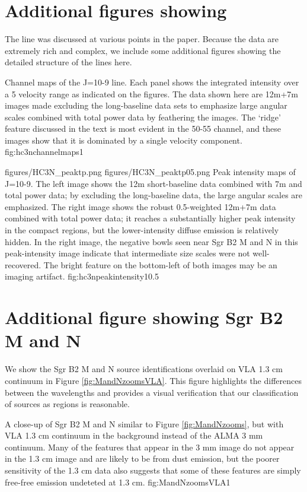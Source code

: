 \documentclass[twocolumn]{aastex61}
\begin{document}
\section{Additional figures showing \cyanoacetylene}
\label{sec:hc3nfigures}
The \cyanoacetylene line was discussed at various points in the paper.  Because
the data are extremely rich and complex,  we include some additional figures
showing the detailed
structure of the lines here.

{Channel maps of the \cyanoacetylene J=10-9 line.  Each panel shows the integrated
intensity over a 5 \kms velocity range as indicated on the figures.
The data shown here are 
12m+7m images made excluding the long-baseline data sets to emphasize
large angular scales
combined with total power
data by feathering the images.
The `ridge' feature  discussed in the text is most evident in the 50-55 \kms
channel, and these images show that it is dominated by a single velocity
component.
}
{fig:hc3nchannelmaps}{1}{\textwidth}

\FigureTwo
{figures/HC3N_peaktp.png}
{figures/HC3N_peaktp05.png}
{Peak intensity maps of \cyanoacetylene J=10-9.
The left image shows the 12m short-baseline data combined with 7m and total
power data; by excluding the long-baseline data, the large angular scales are
emphasized.  The right image shows the robust 0.5-weighted 12m+7m data combined
with total power data;
it reaches a substantially higher peak intensity in the compact regions, but
the lower-intensity diffuse emission is relatively hidden.  In the right image,
the negative bowls seen near Sgr B2 M and N in this peak-intensity image
indicate that intermediate size scales were not well-recovered.  The bright
feature on the bottom-left of both images may be an imaging artifact.}
{fig:hc3npeakintensity}{1}{0.5\textwidth}

\section{Additional figure showing Sgr B2 M and N}
\label{sec:onept3cm}
We show the Sgr B2 M and N source identifications overlaid on VLA 1.3 cm
continuum \citep{De-Pree2014a} in Figure \ref{fig:MandNzoomsVLA}.  This figure
highlights the differences between the wavelengths and provides a visual
verification that our classification of sources as \hii regions is reasonable.

{A close-up of Sgr B2 M and N similar to Figure \ref{fig:MandNzooms}, but with
VLA 1.3 cm continuum \citep{De-Pree2014a} in the background instead of the ALMA 3 mm
continuum.  Many of the features that appear in the 3 mm image do not appear
in the 1.3 cm image and are likely to be from dust emission, but the poorer sensitivity
of the 1.3 cm data also suggests that some of these features are simply 
free-free emission undeteted at 1.3 cm.}
{fig:MandNzoomsVLA}{1}{\textwidth}
\end{document}

